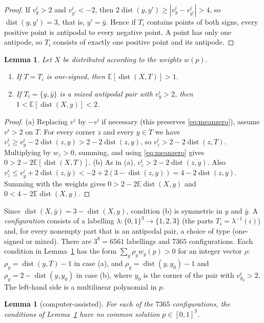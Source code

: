 \documentclass[11pt,letterpaper]{article}
\newtheorem{lemma}[theorem]{Lemma}
\theoremstyle{definition}
\newcommand{\E}{\mathbb{E}}
\DeclareMathOperator{\dist}{dist}
\begin{document}
\begin{proof}
If $v^i_y>2$ and $v^i_{y'}<-2$, then $2\dist(y,y')\ge|v^i_y-v^i_{y'}|>4$, so $\dist(y,y')=3$, that
is, $y'=\bar y$. Hence if $T_i$ contains points of both signs, every positive point is antipodal to
every negative point. A point has only one antipode, so $T_i$ consists of exactly one positive
point and its antipode.
\end{proof}

\begin{lemma}\label{lem:necessary}
Let $X$ be distributed according to the weights $w(p)$.
\begin{enumerate}[label=(\alph*),itemsep=0pt]
\item If $T=T_i$ is one-signed, then $\E[\dist(X,T)]>1$.
\item If $T_i=\{y,\bar y\}$ is a mixed antipodal pair with $v^i_y>2$, then
$1<\E[\dist(X,y)]<2$.
\end{enumerate}
\end{lemma}

\begin{proof}
(a) Replacing $v^i$ by $-v^i$ if necessary (this preserves \eqref{eq:meanzero}), assume $v^i>2$ on
$T$. For every corner $z$ and every $y\in T$ we have $v^i_z\ge v^i_y-2\dist(z,y)>2-2\dist(z,y)$, so
$v^i_z>2-2\dist(z,T)$. Multiplying by $w_z>0$, summing, and using \eqref{eq:meanzero} gives
$0>2-2\E[\dist(X,T)]$.
(b) As in (a), $v^i_z>2-2\dist(z,y)$. Also $v^i_z\le v^i_{\bar y}+2\dist(z,\bar
y)<-2+2(3-\dist(z,y))=4-2\dist(z,y)$. Summing with the weights gives $0>2-2\E\dist(X,y)$ and
$0<4-2\E\dist(X,y)$.
\end{proof}

Since $\dist(X,\bar y)=3-\dist(X,y)$, condition (b) is symmetric in $y$ and $\bar y$. A
\emph{configuration} consists of a labelling $\lambda\colon\{0,1\}^3\to\{1,2,3\}$ (the parts
$T_i=\lambda^{-1}(i)$) and, for every nonempty part that is an antipodal pair, a choice of type
(one-signed or mixed). There are $3^8=6561$ labellings and $7365$ configurations. Each condition in
Lemma~\ref{lem:necessary} has the form $\sum_y\rho_y w_y(p)>0$ for an integer vector $\rho$:
$\rho_y=\dist(y,T)-1$ in case (a), and $\rho_y=\dist(y,y_0)-1$ and $\rho_y=2-\dist(y,y_0)$ in case
(b), where $y_0$ is the corner of the pair with $v^i_{y_0}>2$. The left-hand side is a multilinear
polynomial in $p$.

\begin{lemma}[computer-assisted]\label{lem:computer}
For each of the $7365$ configurations, the conditions of Lemma~\ref{lem:necessary} have no
common solution $p\in[0,1]^3$.
\end{lemma}
\end{document}
